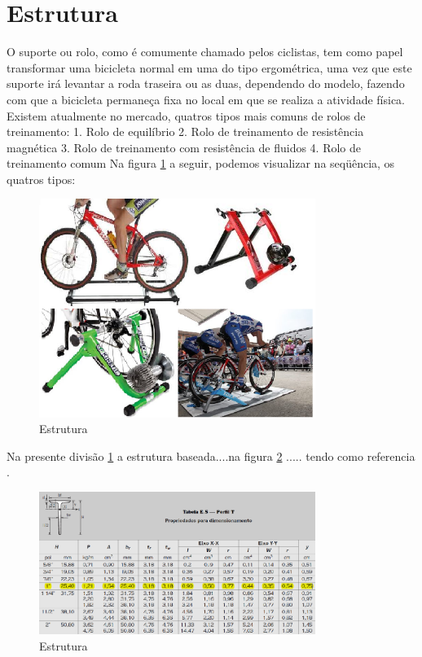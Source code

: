 \section{Estrutura} \label{Secao Estrutura}

O suporte ou rolo, como é comumente chamado pelos ciclistas, tem como papel transformar uma bicicleta normal em uma do tipo ergométrica, uma vez que este suporte irá levantar a roda traseira ou as duas, dependendo do modelo, fazendo com que a bicicleta permaneça fixa no local em que se realiza a atividade física.  Existem atualmente no mercado, quatros tipos mais comuns de rolos de treinamento:
1.	Rolo de equilíbrio
2.	Rolo de treinamento de resistência magnética
3.	Rolo de treinamento com resistência de fluidos
4.	Rolo de treinamento comum
Na figura \ref{fig:rolos} a seguir, podemos visualizar na seqüência, os quatros tipos:

\begin{figure}[h]
    \centering
    \includegraphics[width=0.8\textwidth]{figuras/rolos.png}
    \caption{Estrutura}
    \label{fig:rolos}
\end{figure}


Na presente divisão \ref{Secao Estrutura}  a estrutura baseada....na figura \ref{fig:awesome_image} ..... tendo como referencia \cite{shigley2011shigley}.

\begin{figure}[h]
    \centering
    \includegraphics[width=0.8\textwidth]{figuras/perfil_t.png}
    \caption{Estrutura}
    \label{fig:awesome_image}
\end{figure}
